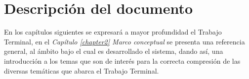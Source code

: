 \section{Descripción del documento}
En los capítulos siguientes se expresará a mayor profundidad el Trabajo Terminal, en el \textit{Capítulo \ref{chapter2} Marco conceptual} se presenta una referencia general, al ámbito bajo el cual es desarrollado el sistema, dando así, una introducción a los temas que son de interés para la correcta compresión de las diversas temáticas que abarca el Trabajo Terminal.



